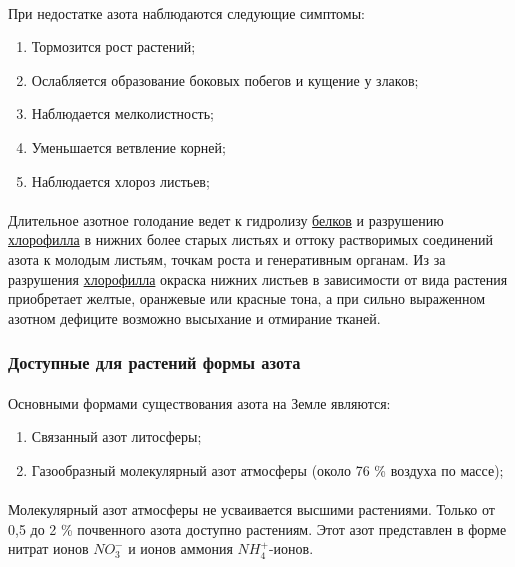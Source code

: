 \paragraph*{}При \hypertarget{nitroHungry}{недостатке} азота наблюдаются следующие симптомы: 

\begin{enumerate}
	\item Тормозится рост растений;
	\item Ослабляется образование боковых побегов и кущение у злаков; 
	\item Наблюдается мелколистность;
	\item Уменьшается ветвление корней;
	\item Наблюдается хлороз листьев;
\end{enumerate}

\paragraph*{}Длительное азотное голодание ведет к гидролизу \hyperlink{proteins}{белков} и разрушению \hyperlink{sect_hlorophilus}{хлорофилла} в нижних более старых листьях и оттоку растворимых соединений азота к молодым листьям, точкам роста и генеративным органам. Из за разрушения \hyperlink{sect_hlorophilus}{хлорофилла} окраска нижних листьев в зависимости от вида растения приобретает желтые, оранжевые или красные тона, а при сильно выраженном азотном дефиците возможно высыхание и отмирание тканей.

\subsubsection*{Доступные для растений формы азота}

\paragraph*{}Основными формами существования азота на Земле являются:

\begin{enumerate}

\item Связанный азот литосферы;
\item Газообразный молекулярный азот атмосферы (около 76 \% воздуха по массе);

\end{enumerate}

\paragraph*{}Молекулярный азот атмосферы не усваивается высшими растениями. Только от 0,5 до 2 \% почвенного азота доступно растениям. Этот азот представлен в форме нитрат ионов $NO^{-}_{3}$ и ионов аммония $NH^{+}_{4}$-ионов.

